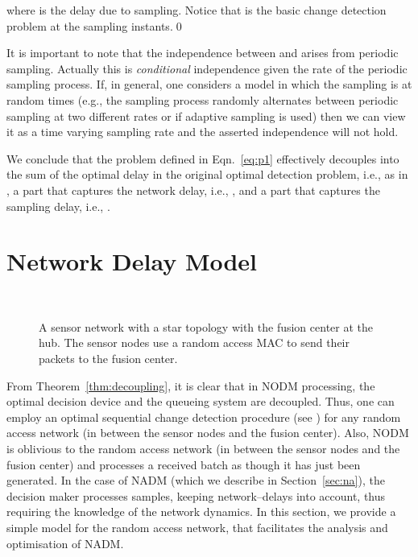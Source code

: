 \documentclass[acmtosn]{acmtrans2m}
\begin{document}
where  is the delay due to sampling. Notice that 
is the basic change detection problem at the sampling instants.\qed

\begin{remarks}It is important to note that the independence between
   and  arises from periodic
  sampling. Actually this is \emph{conditional} independence given the
  rate of the periodic sampling process. If, in general, one considers
  a model in which the sampling is at random times (e.g., the sampling
  process randomly alternates between periodic sampling at two
  different rates or if adaptive sampling is used) then we can view it
  as a time varying sampling rate and the asserted independence will
  not hold. 
\end{remarks}


We conclude that the problem defined in Eqn.~\ref{eq:p1}
effectively decouples into the sum of the 
optimal delay in the original optimal detection problem, i.e.,
 as in
\cite{veeravalli01decentralized-quickest}, a part that captures
the network delay, i.e., , and a part that 
captures the sampling delay, i.e., .

\section{Network Delay Model}
\label{sec:net_delay_model}
\begin{figure}[t]
   \centering \
   \caption{A sensor network with a star topology with the fusion
     center at the hub. The sensor nodes use a random access MAC to
     send their packets to the fusion center.}
   \label{fig:wsn_star}
 \end{figure}
From Theorem~\ref{thm:decoupling}, it is clear that in {\sf NODM} 
processing, the optimal decision device and the queueing system are 
decoupled. Thus, one can employ an optimal sequential change 
detection procedure (see \cite{shiryayev}) for any random
access network (in between the sensor nodes and the fusion center). 
Also, {\sf NODM} is oblivious to the random access network
(in between the sensor nodes and the fusion center) and processes
a received batch as though it has just been generated.  
In the case of {\sf NADM} (which we describe in Section~\ref{sec:na}), 
the decision maker processes samples, keeping network--delays
into account, thus requiring the knowledge of the network dynamics. 
In this section, we provide a simple model
for the random access network, that facilitates the analysis and 
optimisation of {\sf NADM}. 
\end{document}
